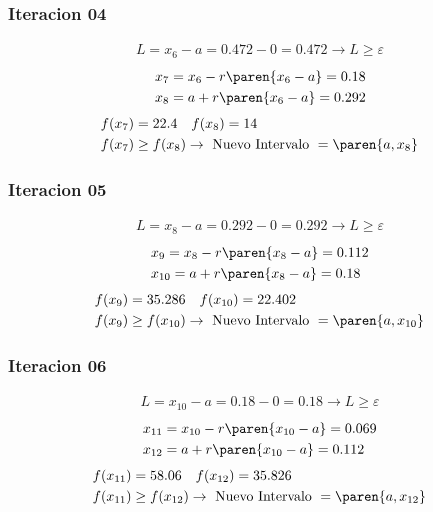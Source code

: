 \begin{homeworkProblem}
\subsubsection{Iteracion 04}
\begin{align*}
    L=x_6-a=0.472-0=0.472 \rightarrow L \geq \varepsilon
\end{align*}
\begin{align*}
    &x_7=x_6 - r\paren{x_6-a}= 0.18 \\
    &x_8=a + r\paren{x_6-a}= 0.292
\end{align*}
\begin{align*}
    &f(x_7)=22.4 \quad f(x_8)=14 \\
    &f(x_7) \geq f(x_8) \rightarrow \text{ Nuevo Intervalo } = \paren{a,x_8}
\end{align*}

\subsubsection{Iteracion 05}
\begin{align*}
    L=x_8-a=0.292-0=0.292 \rightarrow L \geq \varepsilon
\end{align*}
\begin{align*}
    &x_9=x_8 - r\paren{x_8-a}= 0.112\\
    &x_{10}=a + r\paren{x_8-a}= 0.18
\end{align*}
\begin{align*}
    &f(x_9)=35.286 \quad f(x_{10})=22.402 \\
    &f(x_9) \geq f(x_{10}) \rightarrow \text{ Nuevo Intervalo } = \paren{a,x_{10}}
\end{align*}


\subsubsection{Iteracion 06}
\begin{align*}
    L=x_{10}-a=0.18-0=0.18 \rightarrow L \geq \varepsilon
\end{align*}
\begin{align*}
    &x_{11}=x_{10} - r\paren{x_{10}-a}= 0.069\\
    &x_{12}=a + r\paren{x_{10}-a}= 0.112
\end{align*}
\begin{align*}
    &f(x_{11})=58.06 \quad f(x_{12})=35.826 \\
    &f(x_{11}) \geq f(x_{12}) \rightarrow \text{ Nuevo Intervalo } = \paren{a,x_{12}}
\end{align*}


\end{homeworkProblem}
